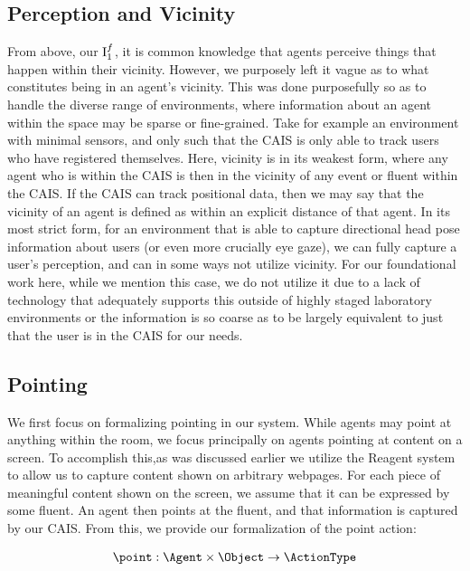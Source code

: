 \subsection{Perception and Vicinity}

From above, our $\textnormal{I}_{1}^{f}$, it is common knowledge that agents perceive
things that happen within their vicinity. However, we purposely left it vague as to
what constitutes being in an agent's vicinity. This was done purposefully so as to
handle the diverse range of environments, where information about an agent within
the space may be sparse or fine-grained. Take for example an environment with minimal
sensors, and only such that the CAIS is only able to track users who have registered
themselves. Here, vicinity is in its weakest form, where any agent who is within the CAIS
is then in the vicinity of any event or fluent within the CAIS. If the CAIS can track
positional data, then we may say that the vicinity of an agent is defined as within an
explicit distance of that agent. In its most strict form, for an environment that is
able to capture directional head pose information about users (or even more crucially
eye gaze), we can fully capture a user's perception, and can in some ways not utilize
vicinity. For our foundational work here, while we mention this case, we do not utilize it
due to a lack of technology that adequately supports this outside of highly staged
laboratory environments or the information is so coarse as to be largely equivalent to just
that the user is in the CAIS for our needs.

\subsection{Pointing}

We first focus on formalizing pointing in our system. While agents may point at anything 
within the room, we focus principally on agents pointing at content on a screen. To 
accomplish this,as was discussed earlier we utilize the Reagent system to allow us to
capture content  shown on arbitrary webpages. For each piece of meaningful content shown on 
the screen, we  assume that it can be expressed by some fluent. An agent then points at the 
fluent, and that information is captured by our CAIS. From this, we provide our
formalization of the point action:

\begin{equation*}
\begin{aligned}
  \point: \Agent \times \Object \rightarrow \ActionType
\end{aligned}
\end{equation*}

